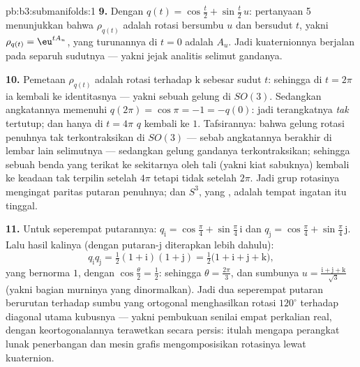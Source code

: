 \begin{solution}{pb:b3:submanifolds:1}
\textbf{9.} Dengan $q(t) = \cos\frac t2 + \sin\frac t2\,u$:
pertanyaan 5 menunjukkan bahwa $\rho_{q(t)}$ adalah rotasi bersumbu $u$
dan bersudut $t$, yakni $\rho_{q(t)} = \eu^{tA_u}$, yang
turunannya di $t = 0$ adalah $A_u$. Jadi kuaternionnya berjalan pada separuh
sudutnya --- yakni jejak analitis selimut gandanya.

\textbf{10.} Pemetaan $\rho_{q(t)}$ adalah rotasi terhadap $\mathrm k$
sebesar sudut $t$: sehingga di $t = 2\pi$ ia kembali ke identitasnya ---
yakni sebuah gelung di $SO(3)$. Sedangkan angkatannya memenuhi $q(2\pi) = \cos\pi =
-1 = -q(0)$: jadi  terangkatnya \emph{tak} tertutup; dan hanya di
$t = 4\pi$ $q$ kembali ke $1$. Tafsirannya: bahwa gelung
rotasi penuhnya tak terkontraksikan di $SO(3)$ --- sebab
angkatannya berakhir di lembar lain selimutnya --- sedangkan
gelung gandanya terkontraksikan; sehingga sebuah benda yang terikat ke sekitarnya oleh
tali (yakni kiat sabuknya) kembali ke keadaan tak terpilin setelah
$4\pi$ tetapi tidak setelah $2\pi$. Jadi grup rotasinya mengingat
paritas putaran penuhnya; dan $S^3$, yang , adalah
tempat ingatan itu tinggal.

\textbf{11.} Untuk seperempat putarannya: $q_{\mathrm i} =
\cos\frac\pi4 + \sin\frac\pi4\,\mathrm i$ dan $q_{\mathrm j} =
\cos\frac\pi4 + \sin\frac\pi4\,\mathrm j$. Lalu hasil kalinya
(dengan putaran-$\mathrm j$ diterapkan lebih dahulu):
\[
q_{\mathrm i}q_{\mathrm j} = \tfrac12(1 + \mathrm i)(1 +
\mathrm j) = \tfrac12\bigl(1 + \mathrm i + \mathrm j +
\mathrm k\bigr),
\]
yang bernorma $1$, dengan $\cos\frac\theta2 = \frac12$: sehingga $\theta =
\frac{2\pi}3$, dan sumbunya $u = \frac{\mathrm i + \mathrm j +
\mathrm k}{\sqrt3}$ (yakni bagian murninya yang dinormalkan). Jadi dua
seperempat putaran berurutan terhadap sumbu yang ortogonal menghasilkan
rotasi $120^\circ$ terhadap diagonal utama kubusnya --- yakni pembukuan
senilai empat perkalian real, dengan keortogonalannya
terawetkan secara persis: itulah mengapa perangkat lunak penerbangan dan mesin grafis
mengomposisikan rotasinya lewat kuaternion.


\end{solution}
